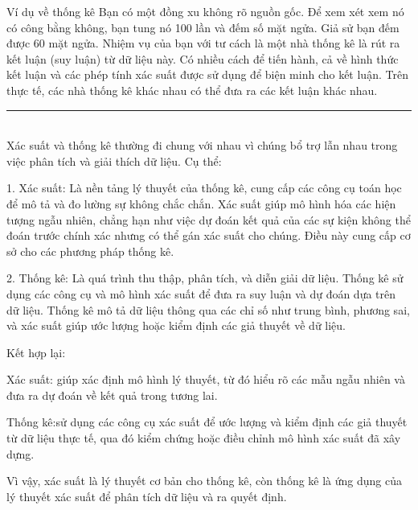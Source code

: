 \documentclass[12pt]{article} %
\begin{document}
Ví dụ về thống kê
Bạn có một đồng xu không rõ nguồn gốc. Để xem xét xem nó có công bằng không, bạn tung nó 100 lần và đếm số mặt ngửa. Giả sử bạn đếm được 60 mặt ngửa. Nhiệm vụ của bạn với tư cách là một nhà thống kê là rút ra kết luận (suy luận) từ dữ liệu này. Có nhiều cách để tiến hành, cả về hình thức kết luận và các phép tính xác suất được sử dụng để biện minh cho kết luận. Trên thực tế, các nhà thống kê khác nhau có thể đưa ra các kết luận khác nhau.

\noindent\rule{\textwidth}{.4pt} \\

Xác suất và thống kê thường đi chung với nhau vì chúng bổ trợ lẫn nhau trong việc phân tích và giải thích dữ liệu. Cụ thể:

1. Xác suất: Là nền tảng lý thuyết của thống kê, cung cấp các công cụ toán học để mô tả và đo lường sự không chắc chắn. Xác suất giúp mô hình hóa các hiện tượng ngẫu nhiên, chẳng hạn như việc dự đoán kết quả của các sự kiện không thể đoán trước chính xác nhưng có thể gán xác suất cho chúng. Điều này cung cấp cơ sở cho các phương pháp thống kê.

2. Thống kê: Là quá trình thu thập, phân tích, và diễn giải dữ liệu. Thống kê sử dụng các công cụ và mô hình xác suất để đưa ra suy luận và dự đoán dựa trên dữ liệu. Thống kê mô tả dữ liệu thông qua các chỉ số như trung bình, phương sai, và xác suất giúp ước lượng hoặc kiểm định các giả thuyết về dữ liệu.

Kết hợp lại:

Xác suất: giúp xác định mô hình lý thuyết, từ đó hiểu rõ các mẫu ngẫu nhiên và đưa ra dự đoán về kết quả trong tương lai.

Thống kê:sử dụng các công cụ xác suất để ước lượng và kiểm định các giả thuyết từ dữ liệu thực tế, qua đó kiểm chứng hoặc điều chỉnh mô hình xác suất đã xây dựng.

Vì vậy, xác suất là lý thuyết cơ bản cho thống kê, còn thống kê là ứng dụng của lý thuyết xác suất để phân tích dữ liệu và ra quyết định.
\end{document}
